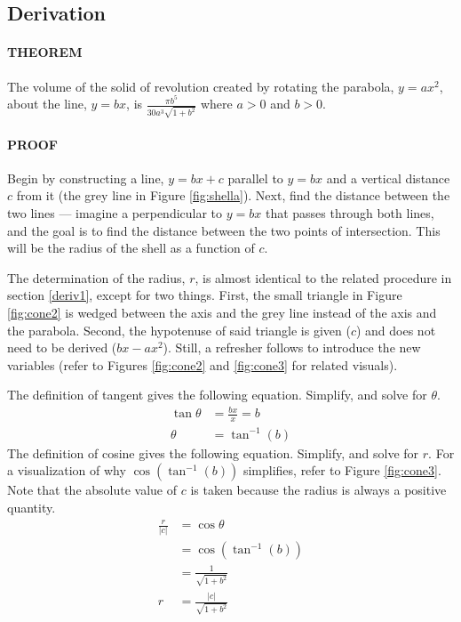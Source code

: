 \documentclass{article}
\begin{document}
\subsection{Derivation} \label{deriv2}
\paragraph{THEOREM} The volume of the solid of revolution created by rotating the parabola, $y=ax^2$, about the line, $y=bx$, is $\frac{\pi b^5}{30a^3\sqrt{1+b^2}}$ where $a>0$ and $b>0$.\par
\smallskip
\paragraph{PROOF} Begin by constructing a line, $y=bx+c$ parallel to $y=bx$ and a vertical distance $c$ from it (the grey line in Figure \ref{fig:shella}). Next, find the distance between the two lines --- imagine a perpendicular to $y=bx$ that passes through both lines, and the goal is to find the distance between the two points of intersection. This will be the radius of the shell as a function of $c$.\par
The determination of the radius, $r$, is almost identical to the related procedure in section \ref{deriv1}, except for two things. First, the small triangle in Figure \ref{fig:cone2} is wedged between the axis and the grey line instead of the axis and the parabola. Second, the hypotenuse of said triangle is given ($c$) and does not need to be derived ($bx-ax^2$). Still, a refresher follows to introduce the new variables (refer to Figures \ref{fig:cone2} and \ref{fig:cone3} for related visuals).\par
The definition of tangent gives the following equation. Simplify, and solve for $\theta$.
\begin{align*}
\tan\theta &=\frac{bx}{x}=b\\
\theta       &= \tan^{-1}\left(b\right)
\end{align*}
The definition of cosine gives the following equation. Simplify, and solve for $r$. For a visualization of why $\cos\left(\tan^{-1}\left(b\right)\right)$ simplifies, refer to Figure \ref{fig:cone3}. Note that the absolute value of $c$ is taken because the radius is always a positive quantity.
\begin{align*}
\frac{r}{|c|} &=\cos\theta\\
                           &=\cos\left(\tan^{-1}\left(b\right)\right)\\
                           &=\frac{1}{\sqrt{1+b^2}}\\
r                          &=\frac{|c|}{\sqrt{1+b^2}}\tag{5}
\end{align*}\par
\end{document}
